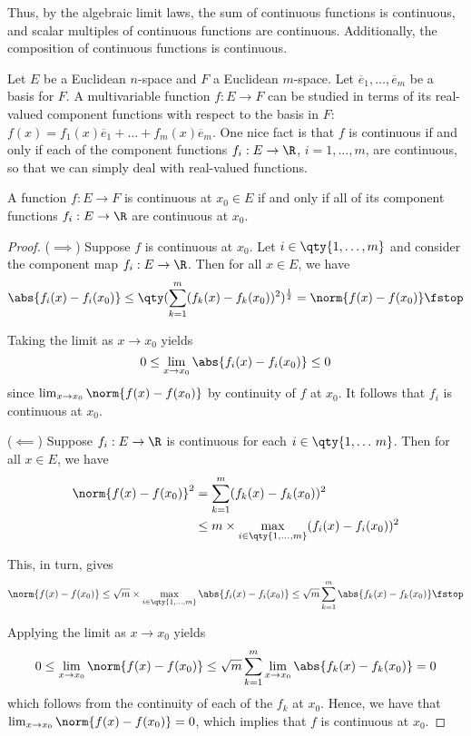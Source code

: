  Thus, by the algebraic limit laws, the sum of continuous functions is continuous, and scalar multiples of continuous functions are continuous. Additionally, the composition of continuous functions is continuous.

 \vspace{3mm}

 Let \( E \) be a Euclidean \( n \)-space and \( F \) a Euclidean \( m \)-space. Let \( \overline{e}_1,\dots,\overline{e}_m \) be a basis for \( F \). A multivariable function \( f:E\to F \) can be studied in terms of its real-valued component functions with respect to the basis in \( F \): \( f(x)=f_1(x)\overline{e}_1+\dots+f_m(x)\overline{e}_m \). One nice fact is that \( f \) is continuous if and only if each of the component functions \( f_i:E\to\R \), \( i=1,\dots, m \), are continuous, so that we can simply deal with real-valued functions.
 \begin{proposition}
   A function \( f:E\to F \) is continuous at \( x_0\in E \) if and only if all of its component functions \( f_i:E\to\R \) are continuous at \( x_0 \).
 \end{proposition}
 \begin{proof}
   (\( \implies \)) Suppose \( f \) is continuous at \( x_0 \). Let \( i\in\qty{1,\dots,m} \) and consider the component map \( f_i:E\to\R \). Then for all \( x\in E \), we have
   \[ \abs{f_i(x)-f_i(x_0)}\leq\qty(\sum_{k=1}^m(f_k(x)-f_k(x_0))^2)^{\frac{1}{2}}=\norm{f(x)-f(x_0)}\fstop \]

   Taking the limit as \( x\to x_0 \) yields
   \[ 0\leq\lim_{x\to x_0}\abs{f_i(x)-f_i(x_0)}\leq 0 \]
   since \( \lim_{x\to x_0}\norm{f(x)-f(x_0)} \) by continuity of \( f \) at \( x_0 \). It follows that \( f_i \) is continuous at \( x_0 \).

   \vspace{3mm}

   (\( \impliedby \)) Suppose \( f_i:E\to\R \) is continuous for each \( i\in\qty{1,\dots\,m} \). Then for all \( x\in E \), we have
   \begin{align*}
     \norm{f(x)-f(x_0)}^2&=\sum_{k=1}^m(f_k(x)-f_k(x_0))^2\\
     &\leq m\times\max_{i\in\qty{1,\dots,m}}(f_i(x)-f_i(x_0))^2
   \end{align*}

   This, in turn, gives
   \[ \norm{f(x)-f(x_0)}\leq \sqrt{m}\times\max_{i\in\qty{1,\dots,m}}\abs{f_i(x)-f_i(x_0)}\leq\sqrt{m}\sum_{k=1}^m\abs{f_k(x)-f_k(x_0)}\fstop \]

   Applying the limit as \( x\to x_0 \) yields
   \[ 0\leq\lim_{x\to x_0}\norm{f(x)-f(x_0)}\leq\sqrt{m}\sum_{k=1}^m\lim_{x\to x_0}\abs{f_k(x)-f_k(x_0)}=0 \]
   which follows from the continuity of each of the \( f_k \) at \( x_0 \). Hence, we have that \( \lim_{x\to x_0}\norm{f(x)-f(x_0)}=0 \), which implies that \( f \) is continuous at \( x_0 \).
 \end{proof}

